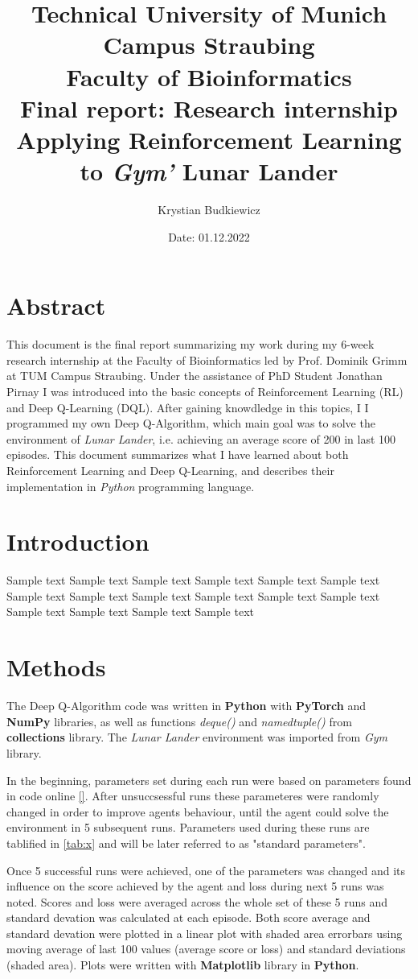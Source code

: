 \documentclass{article}
\title{
  \textbf{
    \huge Technical University of Munich \\ Campus Straubing \\ Faculty of Bioinformatics
      }\\
  \vspace{0,25cm}
  \huge Final report: Research internship \\ Applying Reinforcement Learning to \textit{Gym'} Lunar      Lander
  }
\author{Krystian Budkiewicz}
\date{Date: 01.12.2022}
\begin{document}
\newpage
\section*{Abstract}
This document is the final report summarizing my work during my 6-week research internship at the Faculty of Bioinformatics led by Prof. Dominik Grimm at TUM Campus Straubing. Under the assistance of PhD Student Jonathan Pirnay I was introduced into the basic concepts of Reinforcement Learning (RL) and Deep Q-Learning (DQL). After gaining knowdledge in this topics, I I programmed my own Deep Q-Algorithm, which main goal was to solve the environment of \textit{Lunar Lander}, i.e. achieving an average score of 200 in last 100 episodes.
This document summarizes what I have learned about both Reinforcement Learning and Deep Q-Learning, and describes their implementation in \textit{Python} programming language.

\newpage
\section*{Introduction}
Sample text Sample text Sample text Sample text Sample text Sample text Sample text Sample text
Sample text Sample text Sample text Sample text Sample text Sample text Sample text Sample text
\\

\section*{Methods}
The Deep Q-Algorithm code was written in \textbf{Python} with \textbf{PyTorch} and \textbf{NumPy} libraries, as well as functions \textit{deque()} and \textit{namedtuple()} from \textbf{collections} library. The \textit{Lunar Lander} environment was imported from \textit{Gym} library.

In the beginning, parameters set during each run were based on parameters found in code online \ref{}. After unsuccsessful runs these parameteres were randomly changed in order to improve agents behaviour, until the agent could solve the environment in 5 subsequent runs. Parameters used during these runs are tablified in \ref{tab:x} and will be later referred to as "standard parameters".

Once 5 successful runs were achieved, one of the parameters was changed and its influence on the score achieved by the agent and loss during next 5 runs was noted. Scores and loss were averaged across the whole set of these 5 runs and standard devation was calculated at each episode. Both score average and standard devation were plotted in a linear plot with shaded area errorbars using moving average of last 100 values (average score or loss) and standard deviations (shaded area). Plots were written with \textbf{Matplotlib} library in \textbf{Python}.
\end{document}

